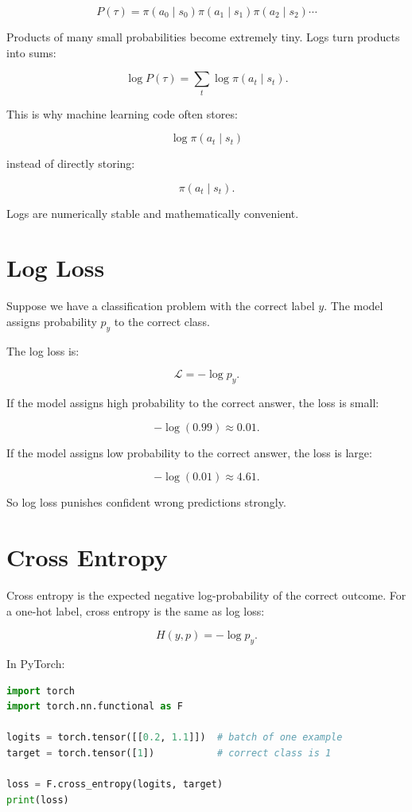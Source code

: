 \documentclass[11pt]{article}
\begin{document}
\[
P(\tau)
=
\pi(a_0 \mid s_0)
\pi(a_1 \mid s_1)
\pi(a_2 \mid s_2)
\cdots
\]

Products of many small probabilities become extremely tiny.
Logs turn products into sums:

\[
\log P(\tau)
=
\sum_t \log \pi(a_t \mid s_t).
\]

This is why machine learning code often stores:

\[
\log \pi(a_t \mid s_t)
\]

instead of directly storing:

\[
\pi(a_t \mid s_t).
\]

Logs are numerically stable and mathematically convenient.

\section{Log Loss}

Suppose we have a classification problem with the correct label $y$.
The model assigns probability $p_y$ to the correct class.

The log loss is:

\[
\mathcal{L}
=
-\log p_y.
\]

If the model assigns high probability to the correct answer, the loss is small:

\[
-\log(0.99) \approx 0.01.
\]

If the model assigns low probability to the correct answer, the loss is large:

\[
-\log(0.01) \approx 4.61.
\]

So log loss punishes confident wrong predictions strongly.

\section{Cross Entropy}

Cross entropy is the expected negative log-probability of the correct outcome.
For a one-hot label, cross entropy is the same as log loss:

\[
H(y, p) = -\log p_y.
\]

In PyTorch:

\begin{lstlisting}[language=Python]
import torch
import torch.nn.functional as F

logits = torch.tensor([[0.2, 1.1]])  # batch of one example
target = torch.tensor([1])           # correct class is 1

loss = F.cross_entropy(logits, target)
print(loss)
\end{lstlisting}
\end{document}
